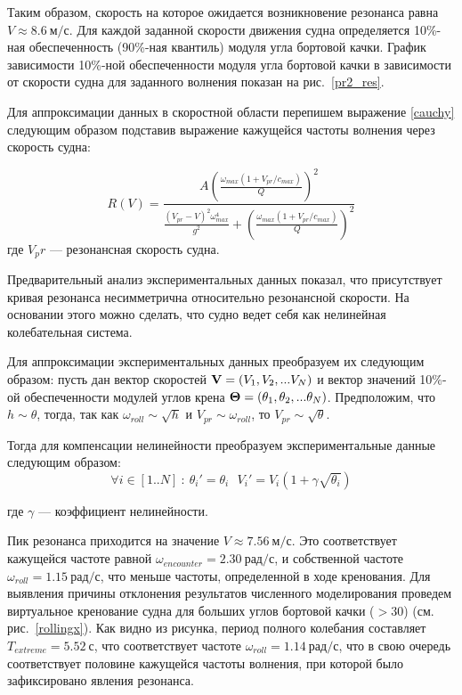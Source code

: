 Таким образом, скорость на которое ожидается возникновение резонанса равна $V \approx 8.6\ \text{м/с}$.
Для каждой заданной скорости движения судна определяется 10\%-ная обеспеченность (90\%-ная квантиль) модуля угла бортовой качки. График зависимости 10\%-ной обеспеченности модуля угла бортовой качки в зависимости от скорости судна для заданного волнения  показан на рис.~\ref{pr2_res}.

Для аппроксимации данных в скоростной области перепишем выражение \eqref{cauchy} следующим образом подставив выражение кажущейся частоты волнения через скорость судна:

\begin{equation}
	R(V) 
		=  \frac{ A \left(   \frac{\omega_{max} (1 + V_{pr}/c_{max})} {Q}   \right) ^2 }
				{
				\frac{ (V_{pr}-V)^2 \omega_{max}^4 } { g^2 }
				+
				\left(   \frac{\omega_{max} (1 + V_{pr}/c_{max})} {Q}   \right) ^2
				}
\end{equation}
где $V_pr$ --- резонансная скорость судна.

Предварительный анализ экспериментальных данных показал, что присутствует кривая резонанса несимметрична относительно резонансной скорости.
На основании этого можно сделать, что судно ведет себя как нелинейная колебательная система. 

Для аппроксимации экспериментальных данных преобразуем их следующим образом: пусть дан вектор скоростей $\mathbf{V}=(V_1,V_2,...V_N)$ и
вектор значений 10\%-ой обеспеченности модулей углов крена $\mathbf{\Theta}=(\theta_1,\theta_2,...\theta_N)$. 
Предположим, что $h \sim \theta$, тогда, так как $\omega_{roll} \sim \sqrt{h}$ и $V_{pr} \sim \omega_{roll}$, то 
$V_{pr} \sim \sqrt{\theta}$.

Тогда для компенсации нелинейности преобразуем экспериментальные данные следующим образом:
\begin{equation}
		\forall i \in [1..N]\ :\ 
		\theta_i' = \theta_i\ \ \		
		V_i' = V_i (1 + \gamma \sqrt{\theta_i})
\end{equation}

где $\gamma$ --- коэффициент нелинейности.

Пик резонанса приходится на значение $V \approx 7.56\ \text{м/с}$.
Это соответствует кажущейся частоте равной $\omega_{encounter} = 2.30\ \text{рад/с}$, и собственной частоте $\omega_{roll} = 1.15\ \text{рад/с}$, 
что меньше частоты, определенной в ходе кренования. 
Для выявления причины отклонения результатов численного моделирования проведем виртуальное кренование судна для больших углов бортовой качки ($>30$) (см. рис.~\ref{rollingx}). Как видно из рисунка, период полного колебания составляет $T_{extreme} = 5.52\ \text{с}$, что соответствует частоте $\omega_{roll} = 1.14\ \text{рад/с}$, что в свою очередь соответствует половине кажущейся частоты волнения, при которой было зафиксировано явления резонанса.


